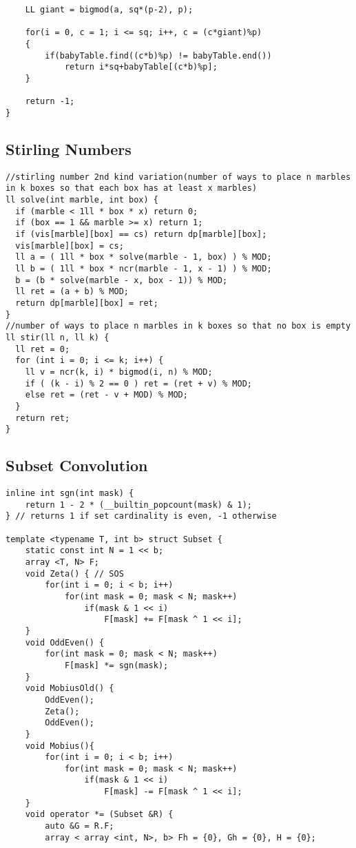 \documentclass[FSZ,a4paper,onesided]{article}
\begin{document}
\begin{multicols*}{\COLS}
\begin{lstlisting}
    LL giant = bigmod(a, sq*(p-2), p);

    for(i = 0, c = 1; i <= sq; i++, c = (c*giant)%p)
    {
        if(babyTable.find((c*b)%p) != babyTable.end())
            return i*sq+babyTable[(c*b)%p];
    }

    return -1;
}
\end{lstlisting}
\subsection{Stirling Numbers}
\begin{lstlisting}
//stirling number 2nd kind variation(number of ways to place n marbles in k boxes so that each box has at least x marbles)
ll solve(int marble, int box) {
  if (marble < 1ll * box * x) return 0;
  if (box == 1 && marble >= x) return 1;
  if (vis[marble][box] == cs) return dp[marble][box];
  vis[marble][box] = cs;
  ll a = ( 1ll * box * solve(marble - 1, box) ) % MOD;
  ll b = ( 1ll * box * ncr(marble - 1, x - 1) ) % MOD;
  b = (b * solve(marble - x, box - 1)) % MOD;
  ll ret = (a + b) % MOD;
  return dp[marble][box] = ret;
}
//number of ways to place n marbles in k boxes so that no box is empty
ll stir(ll n, ll k) {
  ll ret = 0;
  for (int i = 0; i <= k; i++) {
    ll v = ncr(k, i) * bigmod(i, n) % MOD;
    if ( (k - i) % 2 == 0 ) ret = (ret + v) % MOD;
    else ret = (ret - v + MOD) % MOD;
  }
  return ret;
}
\end{lstlisting}
\subsection{Subset Convolution}
\begin{lstlisting}
inline int sgn(int mask) {
    return 1 - 2 * (__builtin_popcount(mask) & 1);
} // returns 1 if set cardinality is even, -1 otherwise

template <typename T, int b> struct Subset {
    static const int N = 1 << b;
    array <T, N> F;
    void Zeta() { // SOS
        for(int i = 0; i < b; i++)
            for(int mask = 0; mask < N; mask++)
                if(mask & 1 << i)
                    F[mask] += F[mask ^ 1 << i];
    }
    void OddEven() {
        for(int mask = 0; mask < N; mask++)
            F[mask] *= sgn(mask);
    }
    void MobiusOld() {
        OddEven();
        Zeta();
        OddEven();
    }
    void Mobius(){
        for(int i = 0; i < b; i++)
            for(int mask = 0; mask < N; mask++)
                if(mask & 1 << i)
                    F[mask] -= F[mask ^ 1 << i];
    }
    void operator *= (Subset &R) {
        auto &G = R.F;
        array < array <int, N>, b> Fh = {0}, Gh = {0}, H = {0};


\end{lstlisting}
\end{multicols*}
\end{document}
